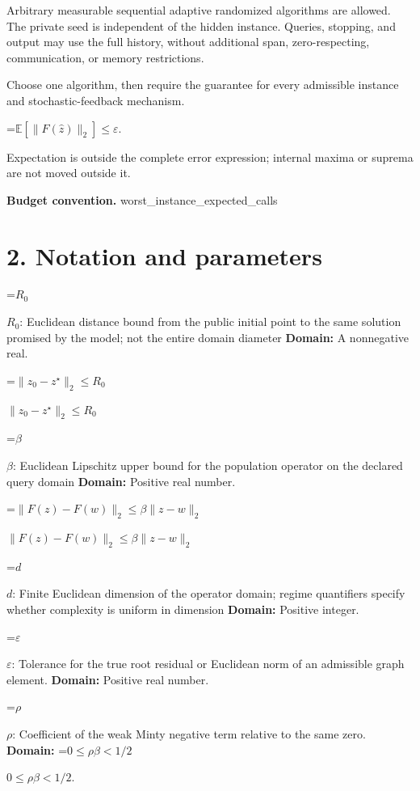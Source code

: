 \documentclass[10pt,a4paper]{article}
\newcommand{\AtlasMath}[1]{\par\begingroup\centering\setbox0=\hbox{$\displaystyle #1$}\ifdim\wd0>1.4\linewidth\typeout{ATLAS WIDE FORMULA: \the\wd0}\fi\ifdim\wd0>\linewidth\resizebox{\linewidth}{!}{\box0}\else\box0\fi\par\endgroup}
\newcommand{\AtlasInlineMath}[1]{\begingroup\setbox0=\hbox{$#1$}\ifdim\wd0>.4\linewidth\endgroup\AtlasMath{#1}\else\endgroup$#1$\fi}
\begin{document}
Arbitrary measurable sequential adaptive randomized algorithms are allowed. The private seed is independent of the hidden instance. Queries, stopping, and output may use the full history, without additional span, zero-respecting, communication, or memory restrictions.



Choose one algorithm, then require the guarantee for every admissible instance and stochastic-feedback mechanism.




\AtlasMath{\mathbb{E}\!\left[\|F(\widehat{z})\|_2\right]\le\varepsilon.}




Expectation is outside the complete error expression; internal maxima or suprema are not moved outside it.



\textbf{Budget convention.} worst\_instance\_expected\_calls



\section{2. Notation and parameters}


\AtlasInlineMath{R_0}: Euclidean distance bound from the public initial point to the same solution promised by the model; not the entire domain diameter \textbf{Domain:} A nonnegative real.



\AtlasInlineMath{\|z_0-z^\star\|_2\le R_0}



\AtlasInlineMath{\beta}: Euclidean Lipschitz upper bound for the population operator on the declared query domain \textbf{Domain:} Positive real number.



\AtlasInlineMath{\|F(z)-F(w)\|_2\le\beta\|z-w\|_2}



\AtlasInlineMath{d}: Finite Euclidean dimension of the operator domain; regime quantifiers specify whether complexity is uniform in dimension \textbf{Domain:} Positive integer.



\AtlasInlineMath{\varepsilon}: Tolerance for the true root residual or Euclidean norm of an admissible graph element. \textbf{Domain:} Positive real number.



\AtlasInlineMath{\rho}: Coefficient of the weak Minty negative term relative to the same zero. \textbf{Domain:} \AtlasInlineMath{0\le\rho\beta<1/2}.
\end{document}
